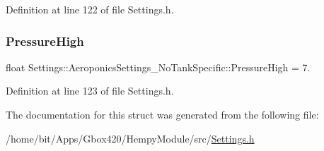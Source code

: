 Definition at line 122 of file Settings.\+h.

\mbox{\label{struct_settings_1_1_aeroponics_settings___no_tank_specific_a11447439cc0d58c6c356b62d5469969c}} 
\subsubsection{\texorpdfstring{Pressure\+High}{PressureHigh}}
{\footnotesize\ttfamily float Settings\+::\+Aeroponics\+Settings\+\_\+\+No\+Tank\+Specific\+::\+Pressure\+High = 7.}



Definition at line 123 of file Settings.\+h.



The documentation for this struct was generated from the following file\+:\begin{DoxyCompactItemize}
\item 
/home/bit/\+Apps/\+Gbox420/\+Hempy\+Module/src/\hyperlink{_hempy_module_2src_2_settings_8h}{Settings.\+h}\end{DoxyCompactItemize}
